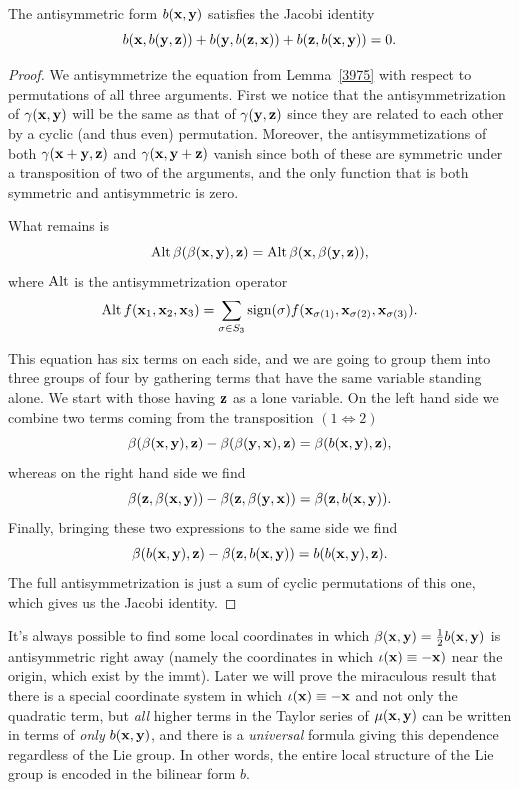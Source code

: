 \begin{lem}
    The antisymmetric form $b(\bf{x},\bf{y})$ satisfies the Jacobi identity
    \[b(\bf{x},b(\bf{y},\bf{z}))+b(\bf{y},b(\bf{z},\bf{x}))+b(\bf{z},b(\bf{x},\bf{y}))=0.\]
\end{lem}
\begin{proof}
    We antisymmetrize the equation from Lemma~\ref{3975} with respect to permutations of all three arguments. First we notice that the antisymmetrization of $\gamma(\bf{x},\bf{y})$ will be the same as that of $\gamma(\bf{y},\bf{z})$ since they are related to each other by a cyclic (and thus even) permutation. Moreover, the antisymmetizations of both $\gamma(\bf{x}+\bf{y},\bf{z})$ and $\gamma(\bf{x},\bf{y}+\bf{z})$ vanish since both of these are symmetric under a transposition of two of the arguments, and the only function that is both symmetric and antisymmetric is zero.

    What remains is 
    \[\Alt \beta(\beta(\bf{x},\bf{y}),\bf{z})=\Alt \beta(\bf{x},\beta(\bf{y},\bf{z})),\]
    where $\Alt$ is the antisymmetrization operator 
    \[\Alt f(\bf{x}_1,\bf{x}_2,\bf{x}_3)=\sum_{\sigma\in S_3}\sign(\sigma)f(\bf{x}_{\sigma(1)},\bf{x}_{\sigma(2)},\bf{x}_{\sigma(3)}).\]

    This equation has six terms on each side, and we are going to group them into three groups of four by gathering terms that have the same variable standing alone. We start with those having $\bf{z}$ as a lone variable. On the left hand side we combine two terms coming from the transposition $(1\Leftrightarrow2)$
    \[\beta(\beta(\bf{x},\bf{y}),\bf{z})-\beta(\beta(\bf{y},\bf{x}),\bf{z})=\beta(b(\bf{x},\bf{y}),\bf{z}),\]
    whereas on the right hand side we find
    \[\beta(\bf{z},\beta(\bf{x},\bf{y}))-\beta(\bf{z},\beta(\bf{y},\bf{x}))=\beta(\bf{z},b(\bf{x},\bf{y})).\]
    Finally, bringing these two expressions to the same side we find
    \[\beta(b(\bf{x},\bf{y}),\bf{z})-\beta(\bf{z},b(\bf{x},\bf{y}))=b(b(\bf{x},\bf{y}),\bf{z}).\]
    The full antisymmetrization is just a sum of cyclic permutations of this one, which gives us the Jacobi identity.
\end{proof}

\begin{rem}
    It's always possible to find some local coordinates in which $\beta(\bf{x},\bf{y})=\frac12 b(\bf{x},\bf{y})$ is antisymmetric right away (namely the coordinates in which $\iota(\bf{x})\equiv -\bf{x})$ near the origin, which exist by the \gls{immt}). Later we will prove the miraculous result that there is a special coordinate system in which $\iota(\bf{x})\equiv-\bf{x}$ and not only the quadratic term, but \emph{all} higher terms in the Taylor series of $\mu(\bf{x},\bf{y})$ can be written in terms of \emph{only} $b(\bf{x},\bf{y})$, and there is a \emph{universal} formula giving this dependence regardless of the Lie group. In other words, the entire local structure of the Lie group is encoded in the bilinear form $b$.
\end{rem}



